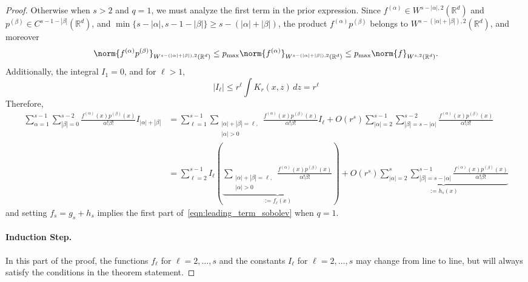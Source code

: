 \documentclass{article}
\newcommand{\Reals}{\mathbb{R}}
\newcommand{\abs}[1]{\left \lvert #1 \right \rvert}
\newcommand{\1}{\mathbf{1}}
\newcommand{\Rd}{\Reals^d}
\theoremstyle{alden}
\theoremstyle{aldenthm}
\theoremstyle{definition}
\theoremstyle{remark}
\begin{document}
\begin{proof}
	Otherwise when $s > 2$ and $q = 1$, we must analyze the first term in the prior expression. Since $f^{(\alpha)} \in W^{s - \abs{\alpha},2}(\Rd)$ and $p^{(\beta)} \in C^{s - 1 - \abs{\beta}}(\Rd)$, and $\min\{s - \abs{\alpha}, s - 1 - \abs{\beta}\} \geq s - (\abs{\alpha} + \abs{\beta})$, the product $f^{(\alpha)} p^{(\beta)}$ belongs to $W^{s - (\abs{\alpha} + \abs{\beta}),2}(\Rd)$, and moreover
	\begin{equation*}
	\norm{f^{(\alpha)} p^{(\beta)}}_{W^{s - (\abs{\alpha} + \abs{\beta}),2}(\Rd)} \leq p_{\max} \norm{f^{(\alpha)}}_{W^{s - (\abs{\alpha} + \abs{\beta}),2}(\Rd)} \leq p_{\max} \norm{f}_{W^{s,2}(\Rd)}.
	\end{equation*} 
	Additionally, the integral $I_1 = 0$, and for $\ell > 1$,
	\begin{equation*}
	\abs{I_{\ell}} \leq r^{\ell} \int K_r(x,z)\,dz = r^{\ell}
	\end{equation*}
	Therefore,
	\begin{align*}
	\sum_{\alpha = 1}^{s - 1} \sum_{\abs{\beta} = 0}^{s-2} \frac{f^{(\alpha)}(x)p^{(\beta)}(x)}{\alpha!\beta!} I_{\abs{\alpha} + \abs{\beta}} & = \sum_{\ell = 1}^{s - 1} \sum_{\substack{\abs{\alpha} + \abs{\beta} = \ell, \\ \abs{\alpha} > 0}} \frac{f^{(\alpha)}(x)p^{(\beta)}(x)}{\alpha!\beta!} I_{\ell} + O(r^{s}) \sum_{\abs{\alpha} = 2}^{s - 1} \sum_{\abs{\beta} = {s - \abs{\alpha}}}^{s - 2} \frac{f^{(\alpha)}(x)p^{(\beta)}(x)}{\alpha!\beta!} \\
	& = \sum_{\ell = 2}^{s - 1} I_{\ell} \left( \underbrace{\sum_{\substack{\abs{\alpha} + \abs{\beta} = \ell, \\ \abs{\alpha} > 0}} \frac{f^{(\alpha)}(x)p^{(\beta)}(x)}{\alpha!\beta!}}_{:= f_{\ell}(x)} \right) + O(r^{s}) \underbrace{\sum_{\abs{\alpha} = 2}^{s} \sum_{\abs{\beta} = {s - \abs{\alpha}}}^{s - 1} \frac{f^{(\alpha)}(x)p^{(\beta)}(x)}{\alpha!\beta!}}_{:=h_{s}(x)}
	\end{align*} 
	and setting $f_s = g_s + h_s$ implies the first part of~\eqref{eqn:leading_term_sobolev} when $q = 1$.
	
	\paragraph{Induction Step.}
	In this part of the proof, the functions $f_{\ell}$ for $\ell = 2,\ldots,s$ and the constants $I_{\ell}$ for $\ell = 2,\ldots,s$ may change from line to line, but will always satisfy the conditions in the theorem statement.
	

\end{proof}
\end{document}
